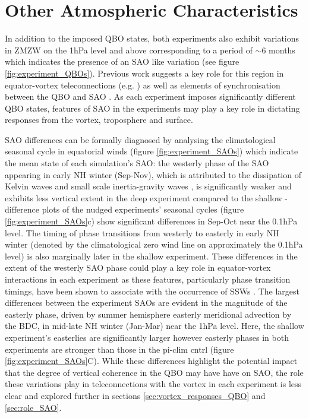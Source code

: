 \section{Other Atmospheric Characteristics}

In addition to the imposed QBO states, both experiments also exhibit variations in ZMZW on the 1hPa level and above corresponding to a period of $\sim$6 months which indicates the presence of an SAO like variation (see figure \ref{fig:experiment_QBOs}). Previous work suggests a key role for this region in equator-vortex teleconnections (e.g. \cite{grayForecasting2020}) as well as elements of synchronisation between the QBO and SAO \citep{kuaiNonstationary2009c}. As each experiment imposes significantly different QBO states, features of SAO in the experiments may play a key role in dictating responses from the vortex, troposphere and surface.

SAO differences can be formally diagnosed by analysing the climatological seasonal cycle in equatorial winds (figure \ref{fig:experiment_SAOs}) which indicate the mean state of each simulation's SAO: the westerly phase of the SAO appearing in early NH winter (Sep-Nov), which is attributed to the dissipation of Kelvin waves and small scale inertia-gravity waves \citep{dunkertonRole1979, hitchmanEstimation1988}, is significantly weaker and exhibits less vertical extent in the deep experiment compared to the shallow - difference plots of the nudged experiments' seasonal cycles (figure \ref{fig:experiment_SAOs}c) show significant differences in Sep-Oct near the 0.1hPa level. The timing of phase transitions from westerly to easterly in early NH winter (denoted by the climatological zero wind line on approximately the 0.1hPa level) is also marginally later in the shallow experiment. These differences in the extent of the westerly SAO phase could play a key role in equator-vortex interactions in each experiment as these features, particularly phase transition timings, have been shown to associate with the occurrence of SSWs \citep{grayData2001, hamiltonEffects1998}. The largest differences between the experiment SAOs are evident in the magnitude of the easterly phase, driven by summer hemisphere easterly meridional advection by the BDC, in mid-late NH winter (Jan-Mar) near the 1hPa level. Here, the shallow experiment's easterlies are significantly larger however easterly phases in both experiments are stronger than those in the pi-clim cntrl (figure \ref{fig:experiment_SAOs}C). While these differences highlight the potential impact that the degree of vertical coherence in the QBO may have have on SAO, the role these variations play in teleconnections with the vortex in each experiment is less clear and explored further in sections \ref{sec:vortex_responses_QBO} and \ref{sec:role_SAO}.

